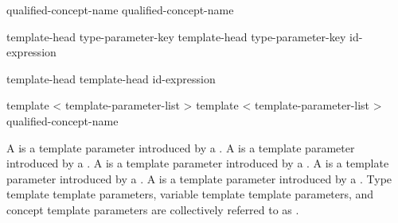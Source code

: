 \documentclass{wg21}
\begin{document}
\begin{bnf}
    \br
    \br
\end{bnf}

\begin{bnf}
    \br
    qualified-concept-name \br
    qualified-concept-name \terminal{<}  \terminal{>}
\end{bnf}

\begin{addedblock}

\begin{bnf}
\br
template-head type-parameter-key  \br
template-head type-parameter-key  \terminal{=} id-expression
\end{bnf}

\begin{bnf}
    \br
    template-head   \br
    template-head   \terminal{=} id-expression
\end{bnf}

\begin{bnf}
    \br
    template < template-parameter-list >   \br
    template < template-parameter-list >   \terminal{=} qualified-concept-name
\end{bnf}

A  is a template parameter introduced by a .
A  is a template parameter introduced by a .
A  is a template parameter introduced by a .
A  is a template parameter introduced by a .
A  is a template parameter introduced by a .
Type template template parameters, variable template template parameters, and concept template parameters are collectively referred to as .

\end{addedblock}

\end{document}
